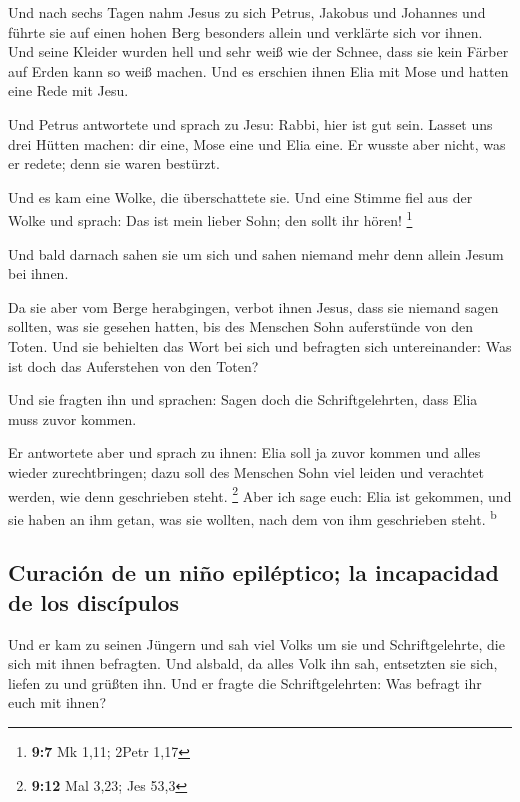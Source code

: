  Und nach sechs Tagen nahm Jesus zu sich Petrus, Jakobus
und Johannes und führte sie auf einen hohen Berg besonders allein und
verklärte sich vor ihnen.  Und seine Kleider wurden hell
und sehr weiß wie der Schnee, dass sie kein Färber auf Erden kann so
weiß machen.  Und es erschien ihnen Elia mit Mose und
hatten eine Rede mit Jesu.

 Und Petrus antwortete und sprach zu Jesu: Rabbi, hier ist
gut sein. Lasset uns drei Hütten machen: dir eine, Mose eine und Elia
eine.  Er wusste aber nicht, was er redete; denn sie waren
bestürzt.

 Und es kam eine Wolke, die überschattete sie. Und eine
Stimme fiel aus der Wolke und sprach: Das ist mein lieber Sohn; den
sollt ihr hören! \footnote{\textbf{9:7} Mk 1,11; 2Petr 1,17}

 Und bald darnach sahen sie um sich und sahen niemand mehr
denn allein Jesum bei ihnen.

 Da sie aber vom Berge herabgingen, verbot ihnen Jesus,
dass sie niemand sagen sollten, was sie gesehen hatten, bis des Menschen
Sohn auferstünde von den Toten.  Und sie behielten das
Wort bei sich und befragten sich untereinander: Was ist doch das
Auferstehen von den Toten?

 Und sie fragten ihn und sprachen: Sagen doch die
Schriftgelehrten, dass Elia muss zuvor kommen.

 Er antwortete aber und sprach zu ihnen: Elia soll ja
zuvor kommen und alles wieder zurechtbringen; dazu soll des Menschen
Sohn viel leiden und verachtet werden, wie denn geschrieben steht.
\footnote{\textbf{9:12} Mal 3,23; Jes 53,3}  Aber ich
sage euch: Elia ist gekommen, und sie haben an ihm getan, was sie
wollten, nach dem von ihm geschrieben steht. \textsuperscript{b}

\hypertarget{curaciuxf3n-de-un-niuxf1o-epiluxe9ptico-la-incapacidad-de-los-discuxedpulos}{%
\subsection{Curación de un niño epiléptico; la incapacidad de los
discípulos}\label{curaciuxf3n-de-un-niuxf1o-epiluxe9ptico-la-incapacidad-de-los-discuxedpulos}}

 Und er kam zu seinen Jüngern und sah viel Volks um sie
und Schriftgelehrte, die sich mit ihnen befragten.  Und
alsbald, da alles Volk ihn sah, entsetzten sie sich, liefen zu und
grüßten ihn.  Und er fragte die Schriftgelehrten: Was
befragt ihr euch mit ihnen?

